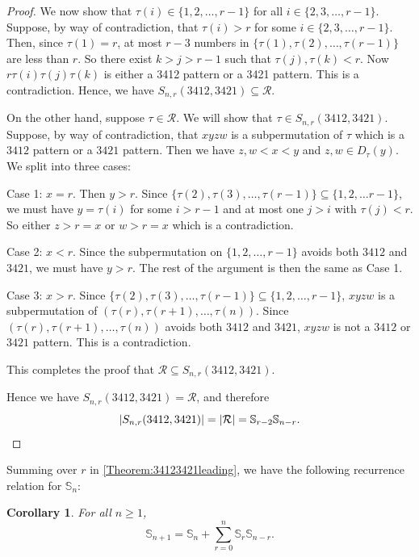\documentclass[11pt]{article}
\newtheorem{corollary}[theorem]{Corollary}
\theoremstyle{definition}
\numberwithin{equation}{section}
\begin{document}
\begin{proof}
We now show that $\tau(i)\in\{1,2,\ldots,r-1\}$ for all $i\in\{2,3,\ldots,r-1\}$. Suppose, by way of contradiction, that $\tau(i)>r$ for some $i\in\{2,3,\ldots,r-1\}$. Then, since $\tau(1)=r$, at most $r-3$ numbers in $\{\tau(1),\tau(2),\ldots,\tau(r-1)\}$ are less than $r$. So there exist $k>j>r-1$ such that $\tau(j),\tau(k)<r$. Now $r\tau(i)\tau(j)\tau(k)$ is either a 3412 pattern or a 3421 pattern. This is a contradiction. Hence, we have $S_{n,r}(3412,3421)\subseteq\mathcal{R}$.

    
    On the other hand, suppose $\tau\in \mathcal{R}$. We will show that $\tau\in S_{n,r}(3412,3421)$. Suppose, by way of contradiction, that $xyzw$ is a subpermutation of $\tau$ which is a $3412$ pattern or a $3421$ pattern. Then we have $z, w<x<y$ and $z,w\in D_\tau(y)$. We split into three cases:

    Case 1: $x=r$. Then $y>r$. Since $\{\tau(2),\tau(3),\ldots,\tau(r-1)\} \subseteq \{1,2,\ldots r-1\}$, we must have $y=\tau(i)$ for some $i>r-1$ and at most one $j>i$ with $\tau(j)<r$. So either $z>r=x$ or $w>r=x$ which is a contradiction.

    Case 2: $x<r$. Since the subpermutation on $\{1,2,\ldots,r-1\}$ avoids both $3412$ and $3421$, we must have $y>r$. The rest of the argument is then the same as Case 1.

    Case 3: $x>r$. Since $\{\tau(2),\tau(3),\ldots,\tau(r-1)\}\subseteq\{1,2,\ldots,r-1\}$, $xyzw$ is a subpermutation of $(\tau(r),\tau(r+1),\ldots,\tau(n))$. Since $(\tau(r),\tau(r+1),\ldots,\tau(n))$ avoids both $3412$ and $3421$, $xyzw$ is not a $3412$ or $3421$ pattern. This is a contradiction.

    This completes the proof that $\mathcal{R}\subseteq S_{n,r}(3412,3421)$.

    Hence we have $S_{n,r}(3412,3421)=\mathcal{R}$, and therefore \[|S_{n,r}(3412,3421)|=|\mathcal{R}|=\mathbb{S}_{r-2}\mathbb{S}_{n-r}.\qedhere\]
\end{proof}
Summing over $r$ in \cref{Theorem:34123421leading}, we have the following recurrence relation for $\mathbb{S}_n$:

\begin{corollary}\label{Corollary:RecurrenceSchroder}
For all $n\geq1$,
\[
\mathbb{S}_{n+1}=\mathbb{S}_n+\sum_{r=0}^{n}\mathbb{S}_{r}\mathbb{S}_{n-r}.
\]
\end{corollary}
\end{document}
